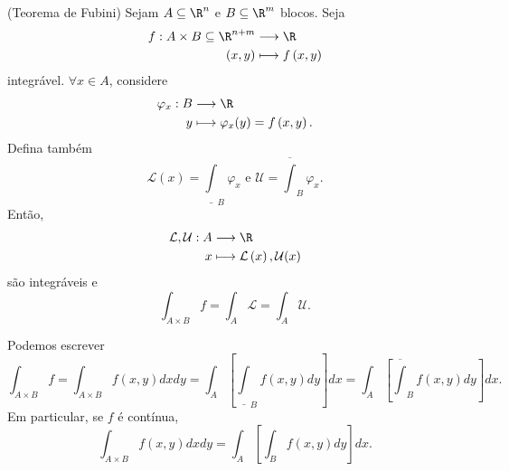 \begin{theorem}
    (Teorema de Fubini) Sejam $A\subseteq\R^{n}$ e $B\subseteq\R^{m}$ blocos. Seja 
    \begin{align*}
        f: A\times B\subseteq\R^{n+m} &\longrightarrow \R \\
        \left( x,y \right)  &\longmapsto f\left( x,y \right)
    \end{align*}
    integrável. $\forall x\in A$, considere
    \begin{align*}
        \varphi_x: B &\longrightarrow \R \\
        y &\longmapsto \varphi_x(y) = f\left( x,y \right) 
    .\end{align*}
    Defina também \[
    \mathcal{L}\left( x \right) = \underline{\int}_B \varphi_x \text{ e }\mathcal{U} = \overline{\int}_B \varphi_x
    .\] Então,
    \begin{align*}
        \mathcal{L}, \mathcal{U}: A &\longrightarrow \R \\
        x &\longmapsto \mathcal{L}\left( x \right) , \mathcal{U}(x)
    \end{align*}
    são integráveis e \[
    \int_{A\times B} f = \int_A \mathcal{L} = \int_A \mathcal{U}
    .\] 
    
    Podemos escrever \[
    \int_{A\times B} f = \int_{A\times B} f\left( x,y \right) dx dy = \int_A \left[ \underline{\int}_B f\left( x,y \right) dy \right] dx = \int_A \left[ \overline{\int}_B f\left( x,y \right) dy \right] dx
    .\] Em particular, se $f$ é contínua, \[
    \int_{A\times B} f\left( x,y \right) dx dy = \int_A \left[ \int_B f\left( x,y \right) dy \right] dx
    .\] 
\end{theorem}

